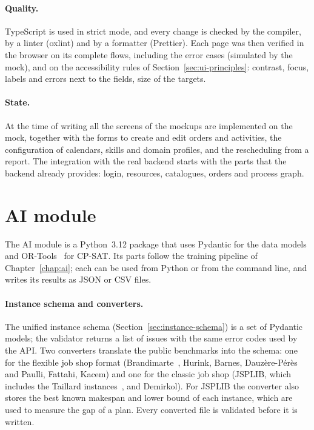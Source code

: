 \paragraph{Quality.} TypeScript is used in strict mode, and every change is checked by the
compiler, by a linter (oxlint) and by a formatter (Prettier). Each page was then verified in the
browser on its complete flows, including the error cases (simulated by the mock), and on the
accessibility rules of Section~\ref{sec:ui-principles}: contrast, focus, labels and errors next
to the fields, size of the targets.

\paragraph{State.} At the time of writing all the screens of the mockups are implemented on the
mock, together with the forms to create and edit orders and activities, the configuration of
calendars, skills and domain profiles, and the rescheduling from a report. The integration with
the real backend starts with the parts that the backend already provides: login, resources,
catalogues, orders and process graph.

\section{AI module}
\label{sec:impl-ai}

The AI module is a Python~3.12 package that uses Pydantic for the data models and
OR-Tools~\cite{ortools} for CP-SAT. Its parts follow the training pipeline of
Chapter~\ref{chap:ai}; each can be used from Python or from the command line, and writes its
results as JSON or CSV files.

\paragraph{Instance schema and converters.} The unified instance schema
(Section~\ref{sec:instance-schema}) is a set of Pydantic models; the validator returns a list of
issues with the same error codes used by the API. Two converters translate the public benchmarks
into the schema: one for the flexible job shop format (Brandimarte~\cite{brandimarte1993},
Hurink, Barnes, Dauzère-Pérès and Paulli, Fattahi, Kacem) and one for the classic job shop
(JSPLIB, which includes the Taillard instances~\cite{taillard1993}, and Demirkol). For JSPLIB the
converter also stores the best known makespan and lower bound of each instance, which are used to
measure the gap of a plan. Every converted file is validated before it is written.


